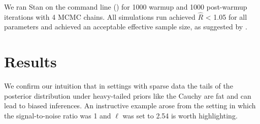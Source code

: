 \documentclass{article}
\begin{document}
We ran Stan on the command line (\citet{cmdstan}) for 1000 warmup and 1000
post-warmup iterations with 4 MCMC chains. All simulations run achieved
$\hat{R}$ < 1.05 for all parameters and achieved an acceptable effective sample
size, as suggested by \citet{gelman2014bayesian}.

\section{Results} \label{results}

We confirm our intuition that in settings with sparse data the tails of the
posterior distribution under heavy-tailed priors like the Cauchy are fat and
can lead to biased inferences. An instructive example arose from the setting in
which the signal-to-noise ratio was 1 and $\ell$ was set to 2.54 is worth
highlighting.
\end{document}
